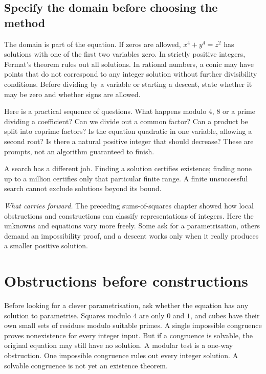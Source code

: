 \subsection*{Specify the domain before choosing the method}
The domain is part of the equation. If zeros are allowed, $x^4+y^4=z^2$ has solutions with one of the first two variables zero. In strictly positive integers, Fermat's theorem rules out all solutions. In rational numbers, a conic may have points that do not correspond to any integer solution without further divisibility conditions. Before dividing by a variable or starting a descent, state whether it may be zero and whether signs are allowed.

Here is a practical sequence of questions. What happens modulo $4$, $8$ or a prime dividing a coefficient? Can we divide out a common factor? Can a product be split into coprime factors? Is the equation quadratic in one variable, allowing a second root? Is there a natural positive integer that should decrease? These are prompts, not an algorithm guaranteed to finish.

A search has a different job. Finding a solution certifies existence; finding none up to a million certifies only that particular finite range. A finite unsuccessful search cannot exclude solutions beyond its bound.

\noindent\emph{What carries forward.} The preceding sums-of-squares chapter showed how local obstructions and constructions can classify representations of integers. Here the unknowns and equations vary more freely. Some ask for a parametrisation, others demand an impossibility proof, and a descent works only when it really produces a smaller positive solution.

\section{Obstructions before constructions}

Before looking for a clever parametrisation, ask whether the equation has any solution to parametrise. Squares modulo $4$ are only $0$ and $1$, and cubes have their own small sets of residues modulo suitable primes. A single impossible congruence proves nonexistence for every integer input. But if a congruence is solvable, the original equation may still have no solution. A modular test is a one-way obstruction. One impossible congruence rules out every integer solution. A solvable congruence is not yet an existence theorem.

